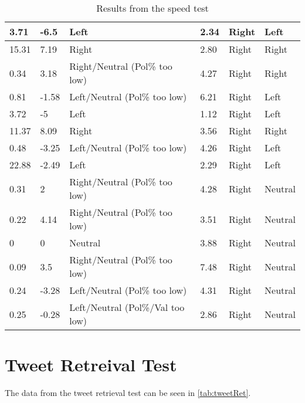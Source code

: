 \begin{table}[H]
\begin{tabular}{|l|l|l|l|l|l|}
3.71	&	-6.5	&	Left								&	2.34	&	Right		&	Left	\\\hline
15.31	&	7.19	&	Right								&	2.80	&	Right		&	Right	\\\hline
0.34	&	3.18	&	Right/Neutral (Pol\% too low)		&	4.27	&	Right		&	Right	\\\hline
0.81	&	-1.58	&	Left/Neutral (Pol\% too low)		&	6.21	&	Right		&	Left	\\\hline
3.72	&	-5		&	Left								&	1.12	&	Right		&	Left	\\\hline
11.37	&	8.09	&	Right								&	3.56	&	Right		&	Right	\\\hline
0.48	&	-3.25	&	Left/Neutral (Pol\% too low)		&	4.26	&	Right		&	Left	\\\hline
22.88	&	-2.49	&	Left								&	2.29	&	Right		&	Left	\\\hline
0.31	&	2		&	Right/Neutral (Pol\% too low)		&	4.28	&	Right		&	Neutral	\\\hline
0.22	&	4.14	&	Right/Neutral (Pol\% too low)		&	3.51	&	Right		&	Neutral	\\\hline
0		&	0		&	Neutral								&	3.88	&	Right		&	Neutral	\\\hline
0.09	&	3.5		&	Right/Neutral (Pol\% too low)		&	7.48	&	Right		&	Neutral	\\\hline
0.24	&	-3.28	&	Left/Neutral (Pol\% too low)		&	4.31	&	Right		&	Neutral	\\\hline
0.25	&	-0.28	&	Left/Neutral (Pol\%/Val too low)	&	2.86	&	Right		&	Neutral	\\\hline

\end{tabular}
\caption{Results from the speed test}
\label{speedTestRes}
\end{table}





\chapter{Tweet Retreival Test}\label{app:tweetRet}
The data from the tweet retrieval test can be seen in \autoref{tab:tweetRet}.



